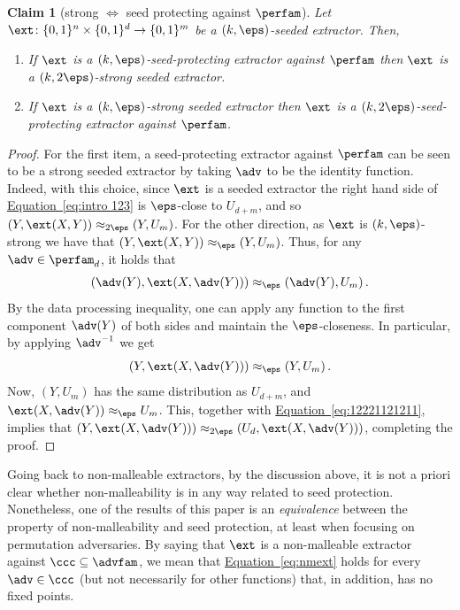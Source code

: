 \documentclass[11pt]{article}
\numberwithin{equation}{section}
\newtheorem{claim}[theorem]{Claim}
\theoremstyle{definition}
\theoremstyle{plain}
\newcommand{\expeqref}[2]{\hyperref[#2]{#1~\eqref{#2}}}
\begin{document}
%
\begin{claim}[strong $\iff$ seed protecting against $\perfam$]\label{c:intro strong sp}
Let $\ext \colon \{0,1\}^n \times \{0,1\}^d \to \{0,1\}^m$ be a $(k,\eps)$-seeded extractor. Then,
	\begin{enumerate}
		\item  If $\ext$ is a $(k,\eps)$-seed-protecting extractor against $\perfam$ then $\ext$ is a $(k,2\eps)$-strong seeded extractor.
		\item  If $\ext$ is a $(k,\eps)$-strong seeded extractor then $\ext$ is a $(k,2\eps)$-seed-protecting extractor against $\perfam$.
	\end{enumerate}
\end{claim}
\begin{proof}
  For the first item, a seed-protecting extractor against $\perfam$ can be seen to be a strong %
seeded extractor   %
by taking $\adv$ to be the identity function. Indeed, with this choice, since $\ext$ is
a 
%
seeded extractor   %
the right hand side of \expeqref{Equation}{eq:intro 123} is $\eps$-close to $U_{d+m}$, and so $(Y,\ext(X,Y)) \approx_{2\eps} (Y,U_m)$. 	For the other direction, as $\ext$ is $(k,\eps)$-strong we have that $(Y,\ext(X,Y)) \approx_\eps (Y,U_m)$. Thus, for any $\adv \in \perfam_d$, it holds that 
	$$(\adv(Y),\ext(X,\adv(Y))) \approx_\eps (\adv(Y),U_m)\,.$$
	By the data processing inequality, one can apply any function to the first component $\adv(Y)$ of both sides and maintain the $\eps$-closeness. In particular, by applying $\adv^{-1}$ we get 
	\begin{equation}\label{eq:12221121211}
	(Y,\ext(X,\adv(Y))) \approx_\eps (Y,U_m)\,.
	\end{equation}
	Now, $(Y,U_m)$ has the same distribution as $U_{d+m}$, and $\ext(X,\adv(Y)) \approx_\eps U_m$. This, together with \expeqref{Equation}{eq:12221121211}, implies that $(Y,\ext(X,\adv(Y))) \approx_{2\eps} (U_d,\ext(X,\adv(Y)))$, completing the proof.
\end{proof}

Going back to non-malleable extractors, by the discussion above, it is not a priori clear whether non-malleability is in any way related to seed protection. Nonetheless, one of the results of %
this paper %
is an \emph{equivalence} between the property of non-malleability and seed protection, at least when focusing on permutation adversaries. By saying that $\ext$ is a non-malleable extractor against $\ccc \subseteq \advfam$, we mean that \expeqref{Equation}{eq:nmext} holds for every $\adv \in \ccc$ (but not necessarily for other functions) that, in addition, has no fixed points. 
\end{document}
